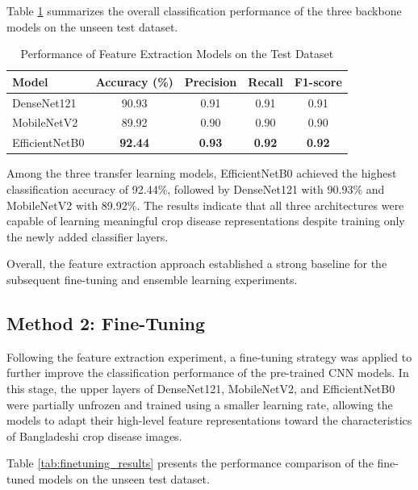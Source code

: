 Table \ref{tab:feature_extraction_results} summarizes the overall classification performance of the three backbone models on the unseen test dataset.
\begin{table}[H]
\centering
\label{tab:feature_extraction_results}
\begin{tabular}{lcccc}
\hline
\textbf{Model} & \textbf{Accuracy (\%)} & \textbf{Precision} & \textbf{Recall} & \textbf{F1-score} \\
\hline
DenseNet121    & 90.93 & 0.91 & 0.91 & 0.91 \\
MobileNetV2    & 89.92 & 0.90 & 0.90 & 0.90 \\
EfficientNetB0 & \textbf{92.44} & \textbf{0.93} & \textbf{0.92} & \textbf{0.92} \\
\hline
\end{tabular}
\caption{Performance of Feature Extraction Models on the Test Dataset}
\end{table}


Among the three transfer learning models, EfficientNetB0 achieved the highest classification accuracy of 92.44\%, followed by DenseNet121 with 90.93\% and MobileNetV2 with 89.92\%. The results indicate that all three architectures were capable of learning meaningful crop disease representations despite training only the newly added classifier layers.

Overall, the feature extraction approach established a strong baseline for the subsequent fine-tuning and ensemble learning experiments.



\subsection{Method 2: Fine-Tuning}

Following the feature extraction experiment, a fine-tuning strategy was applied to further improve the classification performance of the pre-trained CNN models. In this stage, the upper layers of DenseNet121, MobileNetV2, and EfficientNetB0 were partially unfrozen and trained using a smaller learning rate, allowing the models to adapt their high-level feature representations toward the characteristics of Bangladeshi crop disease images.

Table \ref{tab:finetuning_results} presents the performance comparison of the fine-tuned models on the unseen test dataset.


